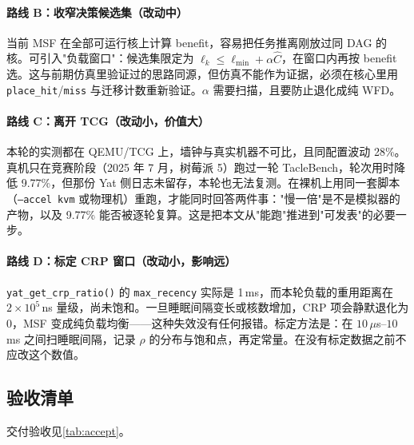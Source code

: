 \paragraph{路线 B：收窄决策候选集（改动中）}
当前 MSF 在全部可运行核上计算 benefit，容易把任务推离刚放过同 DAG 的核。可引入"负载窗口"：候选集限定为 $\ell_k\le\ell_{\min}+\alpha\hat{C}$，在窗口内再按 benefit 选。这与前期仿真里验证过的思路同源，但仿真不能作为证据，必须在核心里用 \texttt{place\_hit}/\texttt{miss} 与迁移计数重新验证。$\alpha$ 需要扫描，且要防止退化成纯 WFD。

\paragraph{路线 C：离开 TCG（改动小，价值大）}
本轮的实测都在 QEMU/TCG 上，墙钟与真实机器不可比，且同配置波动 28\%。真机只在竞赛阶段（2025 年 7 月，树莓派 5）跑过一轮 TacleBench，轮次用时降低 9.77\%，但那份 Yat 侧日志未留存，本轮也无法复测。在裸机上用同一套脚本（\texttt{--accel kvm} 或物理机）重跑，才能同时回答两件事："慢一倍"是不是模拟器的产物，以及 9.77\% 能否被逐轮复算。这是把本文从"能跑"推进到"可发表"的必要一步。

\paragraph{路线 D：标定 CRP 窗口（改动小，影响远）}
\texttt{yat\_get\_crp\_ratio()} 的 \texttt{max\_recency} 实际是 1\,ms，而本轮负载的重用距离在 $2\times10^5$\,ns 量级，尚未饱和。一旦睡眠间隔变长或核数增加，CRP 项会静默退化为 0，MSF 变成纯负载均衡——这种失效没有任何报错。标定方法是：在 $10\,\mu$s--$10$\,ms 之间扫睡眠间隔，记录 $\rho$ 的分布与饱和点，再定常量。在没有标定数据之前不应改这个数值。

\subsection{验收清单}

交付验收见\autoref{tab:accept}。

